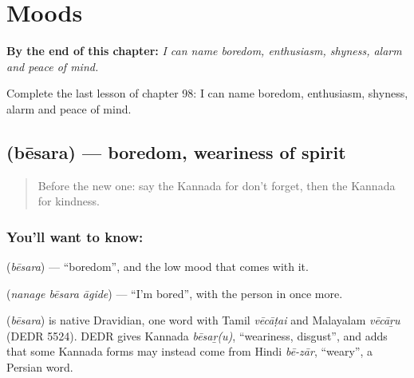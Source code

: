 
\chapter{Moods}
\label{ch:ka-moods}

\begin{chapteropening}
\textbf{By the end of this chapter:} \emph{I can name boredom, enthusiasm, shyness, alarm and peace of mind.}

Complete the last lesson of chapter 98: I can name boredom, enthusiasm, shyness, alarm and peace of mind.
\end{chapteropening}

\section[\texorpdfstring{\kn{ಬೇಸರ} (bēsara)}{ಬೇಸರ (bēsara)}]{ (bēsara) — boredom, weariness of spirit}

\label{lesson:KA-C98-boredom}



\begin{quote}
Before the new one: say the Kannada for don't forget, then the Kannada for kindness.
\end{quote}

\subsection*{You'll want to know: }
\textbf{} (\emph{bēsara}) — \textquotedblleft{}boredom\textquotedblright{}, and the low mood that comes with it.

\textbf{  } (\emph{nanage bēsara āgide}) — \textquotedblleft{}I'm bored\textquotedblright{}, with the person in \textbf{} once more.

\begin{cousinweb}
\textbf{} (\emph{bēsara}) is native Dravidian, one word with Tamil \emph{vēcāṭai} and Malayalam \emph{vēcāṟu} (DEDR 5524). DEDR gives Kannada \emph{bēsaṟ(u)}, \textquotedblleft{}weariness, disgust\textquotedblright{}, and adds that some Kannada forms may instead come from Hindi \emph{bē-zār}, \textquotedblleft{}weary\textquotedblright{}, a Persian word.
\end{cousinweb}

